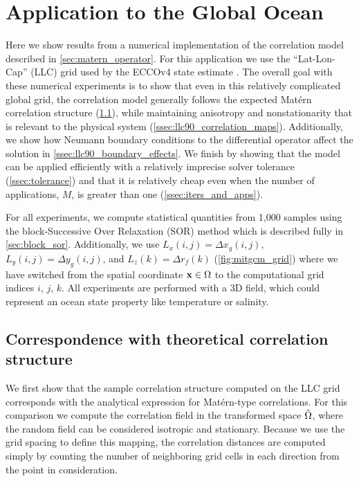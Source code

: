 \section{Application to the Global Ocean}
\label{sec:llc90}

Here we show results from a numerical implementation of the correlation model
described in \cref{sec:matern_operator}.
For this application we use the ``Lat-Lon-Cap'' (LLC) grid used by the ECCOv4
state estimate \cite[][see Sec. 2 for a complete description of the grid]{forgetECCOv4}.
The overall goal with these numerical experiments is to show that even in this
relatively complicated global grid, the
correlation model generally follows the expected Mat\'ern correlation structure
(\cref{ssec:llc90_correlations}), while maintaining
anisotropy and nonstationarity that is relevant to the physical system
(\cref{ssec:llc90_correlation_maps}).
Additionally, we show how Neumann boundary conditions to the differential
operator affect the solution in \cref{ssec:llc90_boundary_effects}.
We finish
by showing that the model can be applied efficiently with a relatively imprecise
solver tolerance (\cref{ssec:tolerance}) and that it is relatively cheap even
when the number of applications, $M$, is greater than one
(\cref{ssec:iters_and_apps}).

For all experiments, we compute statistical quantities from 1,000 samples using
the block-Successive Over Relaxation (SOR) method which is described fully in
\cref{sec:block_sor}.
Additionally, we use
$L_x(i,j) = \Delta x_g(i,j)$, $L_y(i,j) = \Delta y_g(i,j)$,
and $L_z(k) = \Delta r_f(k)$ (\cref{fig:mitgcm_grid}) where we have switched
from the spatial coordinate $\mathbf{x}\in\Omega$ to the computational grid indices $i$, $j$, $k$.
All experiments are performed with a 3D field, which could represent an ocean
state property like temperature or salinity.

\subsection{Correspondence with theoretical correlation structure}
\label{ssec:llc90_correlations}

We first show that the sample correlation structure computed on the LLC
grid corresponds with the analytical expression for
Mat\'ern-type correlations.
For this comparison we compute the correlation field in the transformed space
$\hat{\Omega}$, where the random field can be considered isotropic and stationary.
Because we use the grid spacing to define this mapping, the correlation
distances are computed simply by counting the number of neighboring grid cells in each
direction from the point in consideration.

